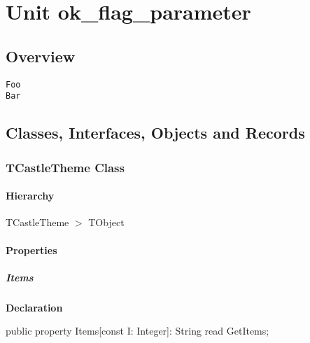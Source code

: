 \documentclass{report}
\begin{document}
\newlength{\tmplength}
\chapter{Unit ok{\_}flag{\_}parameter}
\section{Overview}
\begin{description}
\item[\texttt{\begin{ttfamily}TCastleTheme\end{ttfamily} Class}]
\end{description}
\begin{description}
\item[\texttt{Foo}]
\item[\texttt{Bar}]
\end{description}
\section{Classes, Interfaces, Objects and Records}
\subsection*{TCastleTheme Class}
\subsubsection*{\large{\textbf{Hierarchy}}\normalsize\hspace{1ex}\hfill}
TCastleTheme {$>$} TObject
\subsubsection*{\large{\textbf{Properties}}\normalsize\hspace{1ex}\hfill}
\paragraph*{Items}\hspace*{\fill}

\begin{list}{}{
\setlength{\itemindent}{0cm}
\setlength{\listparindent}{0cm}
\setlength{\leftmargin}{\evensidemargin}
\addtolength{\leftmargin}{\tmplength}
\settowidth{\labelsep}{X}
\addtolength{\leftmargin}{\labelsep}
\setlength{\labelwidth}{\tmplength}
}
\begin{flushleft}
\item[\textbf{Declaration}\hfill]
\begin{ttfamily}
public property Items[const I: Integer]: String read GetItems;\end{ttfamily}


\end{flushleft}
\end{list}
\end{document}
